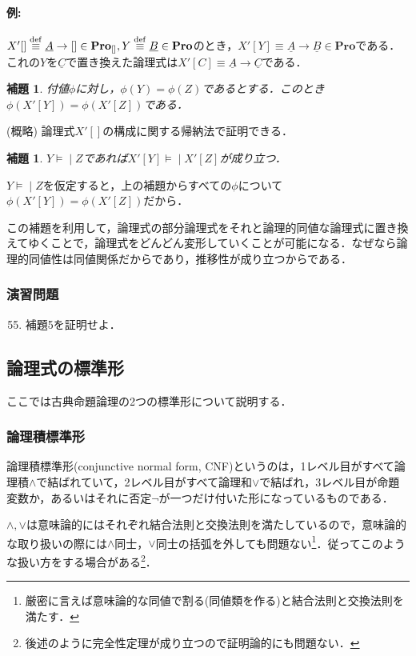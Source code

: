 \documentclass{ltjsarticle}
\makeatletter
\theoremstyle{mystyle1}
\theoremstyle{mystyle3}
\newtheorem{lem}[cor]{補題}
\theoremstyle{mystyle2}
\renewenvironment{proof}[1][\proofname]{\par
  \pushQED{\qed}%
  \normalfont
  \topsep6\p@\@plus6\p@ \trivlist
  \item[\hskip\labelsep{\bfseries\sffamily #1}]\ignorespaces
}{%
  \popQED\endtrivlist\@endpefalse
}
\renewcommand\proofname{\ensuremath{\because}}
\newcommand{\uA}{\underline{A}}
\newcommand{\uB}{\underline{B}}
\newcommand{\uC}{\underline{C}}
\newcommand{\bPro}{\ensuremath{\mathbf{Pro}}}
\newcommand{\dequiv}{\ensuremath{\stackrel{\rm{def}}{\equiv}}}
\newcommand{\lequiv}{\ensuremath{\models\!\mid}}
\newcommand{\red}[1]{{\color{red} #1}}
\makeatother
\begin{document}
\paragraph{例:}
$X'[]\dequiv\uA\to[]\in\bPro_{[]},Y \dequiv\uB\in\bPro$のとき，$X'[Y] \equiv \uA \to \uB\in\bPro$である．これの$Y$を$\uC$で置き換えた論理式は$X'[C] \equiv\uA\to\uC$である．

\begin{lem}
  付値$\phi$に対し，$\phi(Y) = \phi(Z)$であるとする．このとき$\phi(X'[Y]) = \phi(X'[Z])$である．
\end{lem}
\begin{proof}
  (概略) 論理式$X'[]$の構成に関する帰納法で証明できる．
\end{proof}
\begin{lem}
  $Y\lequiv Z$であれば$X'[Y] \lequiv X'[Z]$が成り立つ．
\end{lem}
\begin{proof}
  $Y\lequiv Z$を仮定すると，上の補題からすべての$\phi$について$\phi(X'[Y]) = \phi(X'[Z])$だから．
\end{proof}

この補題を利用して，論理式の部分論理式をそれと論理的同値な論理式に置き換えてゆくことで，論理式をどんどん変形していくことが可能になる．なぜなら論理的同値性は同値関係だからであり，推移性が成り立つからである．
\subsubsection*{演習問題}
\begin{enumerate}
  \setcounter{enumi}{54}
  \item 補題5を証明せよ．
\end{enumerate}
\subsection{論理式の標準形}
ここでは古典命題論理の2つの標準形について説明する．
\subsubsection{論理積標準形}\label{CNF}
\red{論理積標準形}(conjunctive normal form, CNF)というのは，1レベル目がすべて論理積$\wedge$で結ばれていて，2レベル目がすべて論理和$\vee$で結ばれ，3レベル目が命題変数か，あるいはそれに否定$\neg$が一つだけ付いた形になっているものである．

$\wedge, \vee$は意味論的にはそれぞれ結合法則と交換法則を満たしているので，意味論的な取り扱いの際には$\wedge$同士，$\vee$同士の括弧を外しても問題ない\footnote{厳密に言えば意味論的な同値で割る(同値類を作る)と結合法則と交換法則を満たす．}．従ってこのような扱い方をする場合がある\footnote{後述のように完全性定理が成り立つので証明論的にも問題ない．}．
\end{document}
